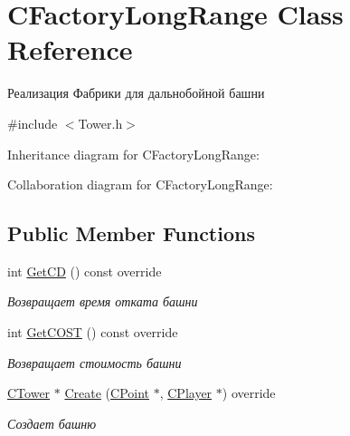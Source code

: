\hypertarget{classCFactoryLongRange}{}\section{C\+Factory\+Long\+Range Class Reference}
\label{classCFactoryLongRange}


Реализация Фабрики для дальнобойной башни  




{\ttfamily \#include $<$Tower.\+h$>$}



Inheritance diagram for C\+Factory\+Long\+Range\+:


Collaboration diagram for C\+Factory\+Long\+Range\+:
\subsection*{Public Member Functions}
\begin{DoxyCompactItemize}
\item 
int \hyperlink{classCFactoryLongRange_a0264f7f976b9e03dc835fb730bdfe9a2}{Get\+CD} () const override\hypertarget{classCFactoryLongRange_a0264f7f976b9e03dc835fb730bdfe9a2}{}\label{classCFactoryLongRange_a0264f7f976b9e03dc835fb730bdfe9a2}

\begin{DoxyCompactList}\small\item\em Возвращает время отката башни \end{DoxyCompactList}\item 
int \hyperlink{classCFactoryLongRange_ac60c241d35e17893dca1e5004417d205}{Get\+C\+O\+ST} () const override\hypertarget{classCFactoryLongRange_ac60c241d35e17893dca1e5004417d205}{}\label{classCFactoryLongRange_ac60c241d35e17893dca1e5004417d205}

\begin{DoxyCompactList}\small\item\em Возвращает стоимость башни \end{DoxyCompactList}\item 
\hyperlink{classCTower}{C\+Tower} $\ast$ \hyperlink{classCFactoryLongRange_a9b55d2ae0a50e2cc9381e42182833c0f}{Create} (\hyperlink{classCPoint}{C\+Point} $\ast$, \hyperlink{classCPlayer}{C\+Player} $\ast$) override
\begin{DoxyCompactList}\small\item\em Создает башню \end{DoxyCompactList}\end{DoxyCompactItemize}


